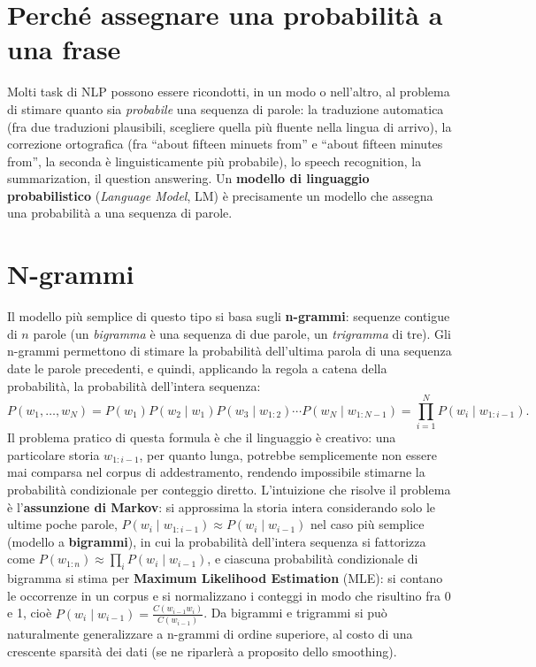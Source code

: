 \documentclass[11pt,a4paper]{report}
\begin{document}
\section{Perché assegnare una probabilità a una frase}

Molti task di NLP possono essere ricondotti, in un modo o nell'altro, al problema di stimare quanto sia \emph{probabile} una sequenza di parole: la traduzione automatica (fra due traduzioni plausibili, scegliere quella più fluente nella lingua di arrivo), la correzione ortografica (fra ``about fifteen minuets from'' e ``about fifteen minutes from'', la seconda è linguisticamente più probabile), lo speech recognition, la summarization, il question answering. Un \textbf{modello di linguaggio probabilistico} (\emph{Language Model}, LM) è precisamente un modello che assegna una probabilità a una sequenza di parole.

\section{N-grammi}

Il modello più semplice di questo tipo si basa sugli \textbf{n-grammi}: sequenze contigue di $n$ parole (un \emph{bigramma} è una sequenza di due parole, un \emph{trigramma} di tre). Gli n-grammi permettono di stimare la probabilità dell'ultima parola di una sequenza date le parole precedenti, e quindi, applicando la regola a catena della probabilità, la probabilità dell'intera sequenza:
\[
P(w_1,\ldots,w_N) = P(w_1)P(w_2\mid w_1)P(w_3\mid w_{1:2})\cdots P(w_N\mid w_{1:N-1}) = \prod_{i=1}^{N} P(w_i \mid w_{1:i-1}).
\]
Il problema pratico di questa formula è che il linguaggio è creativo: una particolare storia $w_{1:i-1}$, per quanto lunga, potrebbe semplicemente non essere mai comparsa nel corpus di addestramento, rendendo impossibile stimarne la probabilità condizionale per conteggio diretto. L'intuizione che risolve il problema è l'\textbf{assunzione di Markov}: si approssima la storia intera considerando solo le ultime poche parole, $P(w_i \mid w_{1:i-1}) \approx P(w_i \mid w_{i-1})$ nel caso più semplice (modello a \textbf{bigrammi}), in cui la probabilità dell'intera sequenza si fattorizza come $P(w_{1:n}) \approx \prod_i P(w_i \mid w_{i-1})$, e ciascuna probabilità condizionale di bigramma si stima per \textbf{Maximum Likelihood Estimation} (MLE): si contano le occorrenze in un corpus e si normalizzano i conteggi in modo che risultino fra 0 e 1, cioè $P(w_i \mid w_{i-1}) = \frac{C(w_{i-1}w_i)}{C(w_{i-1})}$. Da bigrammi e trigrammi si può naturalmente generalizzare a n-grammi di ordine superiore, al costo di una crescente sparsità dei dati (se ne riparlerà a proposito dello smoothing).
\end{document}
